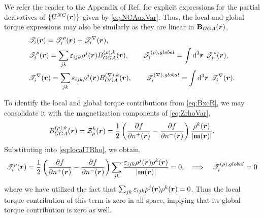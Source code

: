 We refer the reader to the Appendix of Ref. \cite{Li17_2591} for explicit expressions for the partial derivatives of $\{U^{NC}(\boldsymbol{r})\}$
given by \cref{eq:NCAuxVar}.
Thus, the local and global torque expressions may also be similarly as they are linear in $\mathbf{B}_{GGA}(\boldsymbol{r})$,
\begin{align}
&\mathscr{T}_i(\boldsymbol{r}) = \mathscr{T}^\rho_i(\boldsymbol{r}) + \mathscr{T}^\nabla_i(\boldsymbol{r}),\\
&\mathscr{T}^\rho_i(\boldsymbol{r}) = \sum_{jk}\varepsilon_{ijk} \rho^j(\boldsymbol{r}) B^{(\rho),k}_{GGA}(\boldsymbol{r}), \qquad \mathscr{T}_i^{(\rho), global} = \int \mathrm{d}^3\boldsymbol{r}\text{ } \mathscr{T}_i^{\rho}(\boldsymbol{r}) \label{eq:localTRho},\\
&\mathscr{T}^\nabla_i(\boldsymbol{r}) = \sum_{jk}\varepsilon_{ijk} \rho^j(\boldsymbol{r}) B^{(\nabla),k}_{GGA}(\boldsymbol{r}), \qquad \mathscr{T}_i^{(\nabla), global} = \int \mathrm{d}^3\boldsymbol{r}\text{ } \mathscr{T}_i^{\nabla}(\boldsymbol{r}) \label{eq:localTG}.
\end{align}

To identify the local and global torque contributions from \cref{eq:BxcR}, we  may consolidate it with the magnetization components of \cref{eq:ZrhoVar},
\begin{equation}
B^{(\rho),k}_{GGA}(\boldsymbol{r}) = \mathcal{Z}^k_{\rho}(\boldsymbol{r}) = \frac{1}{2} \left(\dfrac{\partial f}{\partial n^+(\boldsymbol{r})} - \dfrac{\partial f}{\partial n^-(\boldsymbol{r})}\right) 
  \frac{\rho^k(\boldsymbol{r})}{\vert \mathbf{m}(\boldsymbol{r}) \vert} . \label{eq:BxcR_eval}
\end{equation}
Substituting into \cref{eq:localTRho}, we obtain,
\begin{equation}
\mathscr{T}^\rho_i(\boldsymbol{r}) = \frac{1}{2} \left(\dfrac{\partial f}{\partial n^+(\boldsymbol{r})} - \dfrac{\partial f}{\partial n^-(\boldsymbol{r})}\right) 
  \sum_{jk} \frac{\varepsilon_{ijk}\rho^j(\boldsymbol{r})\rho^k(\boldsymbol{r})}{\vert\mathbf{m}(\boldsymbol{r})\vert}  = 0, \quad \Longrightarrow \quad \mathscr{T}_i^{(\rho), global} = 0 \label{eq:torR}
\end{equation}
where we have utilized the fact that $\sum_{jk}\varepsilon_{ijk}\rho^j(\boldsymbol{r})\rho^k(\boldsymbol{r}) = 0$. Thus the local torque contribution of this term is zero in all space, implying that
its global torque contribution is zero as well.

